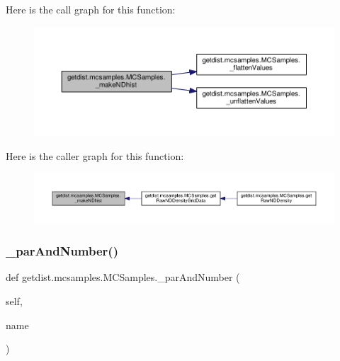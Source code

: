 Here is the call graph for this function\+:
\nopagebreak
\begin{figure}[H]
\begin{center}
\leavevmode
\includegraphics[width=350pt]{classgetdist_1_1mcsamples_1_1MCSamples_a9b4f328726e9e918a2b9a80c7fd614c5_cgraph}
\end{center}
\end{figure}
Here is the caller graph for this function\+:
\nopagebreak
\begin{figure}[H]
\begin{center}
\leavevmode
\includegraphics[width=350pt]{classgetdist_1_1mcsamples_1_1MCSamples_a9b4f328726e9e918a2b9a80c7fd614c5_icgraph}
\end{center}
\end{figure}
\mbox{\label{classgetdist_1_1mcsamples_1_1MCSamples_a6ffc3541b4b059fe621867360b2701fd}} 
\subsubsection{\texorpdfstring{\+\_\+par\+And\+Number()}{\_parAndNumber()}}
{\footnotesize\ttfamily def getdist.\+mcsamples.\+M\+C\+Samples.\+\_\+par\+And\+Number (\begin{DoxyParamCaption}\item[{}]{self,  }\item[{}]{name }\end{DoxyParamCaption})\hspace{0.3cm}{\ttfamily [private]}}



